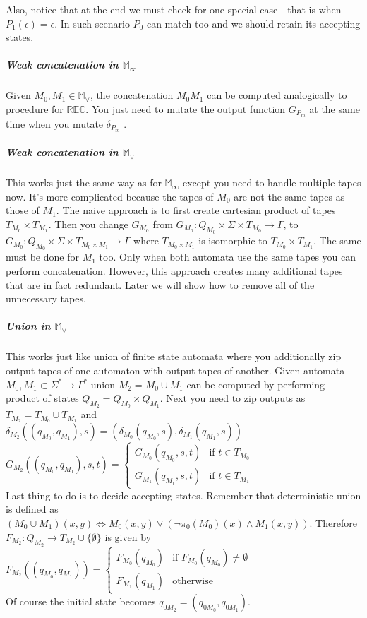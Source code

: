 \documentclass[12pt]{article}
\begin{document}
Also, notice that at the end we must check for one special case - that is when $P_1(\epsilon)=\epsilon$. In such scenario $P_0$ can match too and we should retain its accepting states.
\subparagraph{Weak concatenation in $\mathbb{M}_\infty$} Given $M_0,M_1 \in \mathbb{M}_\vee$, the concatenation $M_0M_1$ can be computed analogically to procedure for $\mathbb{ REG}$. You just need to mutate the output function $G_{P_m}$ at the same time when you mutate $\delta_{P_m}$ . 

\subparagraph{Weak concatenation in $\mathbb{M}_\vee$} This works just the same way as for $\mathbb{M}_\infty$ except you need to handle multiple tapes now. It's more complicated because the tapes of $M_0$ are not the same tapes as those of $M_1$. The naive approach is to first create cartesian product of tapes $T_{M_0} \times T_{M_1}$. Then you change $G_{M_0}$ from $G_{M_0} : Q_{M_0} \times \Sigma \times T_{M_0} \rightarrow \Gamma$, to $G_{M_0} : Q_{M_0} \times \Sigma \times T_{M_0 \times M_1} \rightarrow \Gamma$ where $T_{M_0 \times M_1}$ is isomorphic to $T_{M_0} \times T_{M_1}$. The same must be done for $M_1$ too. Only when both automata use the same tapes you can perform concatenation. However, this approach creates many additional tapes that are in fact redundant. Later we  will show how to remove all of the unnecessary tapes.

\subparagraph{Union in $\mathbb{M}_\vee$}  This works just like union of finite state automata where you additionally zip output tapes of one automaton with output tapes of another. Given automata $M_0,M_1 \subset \Sigma^* \rightarrow \Gamma^*$ union $M_2=M_0 \cup M_1$ can be computed by performing product of states $Q_{M_2} = Q_{M_0} \times Q_{M_1}$. Next you need to zip outputs as $T_{M_2} = T_{M_0} \cup T_{M_1}$  and \\
$\delta_{M_2}((q_{M_0},q_{M_1}),s) = 
(\delta_{M_0}(q_{M_0},s),\delta_{M_1}(q_{M_1},s))$ \\
$G_{M_2}((q_{M_0},q_{M_1}),s,t) = \begin{cases}
G_{M_0}(q_{M_0},s,t)  & \mbox{if }  t \in T_{M_0} \\
G_{M_1}(q_{M_1},s,t)  & \mbox{if }  t \in T_{M_1}
\end{cases}$\\
Last thing to do is to decide accepting states. Remember that deterministic union is defined as $(M_0 \cup M_1)(x,y) \iff M_0(x,y) \vee (\neg \pi_0(M_0)(x) \wedge M_1(x,y))$. Therefore $F_{M_2} : Q_{M_2}  \rightarrow T_{M_2} \cup \{\emptyset\}$ is given by \\
$F_{M_2}((q_{M_0},q_{M_1})) = \begin{cases}
F_{M_0}(q_{M_0})  & \mbox{if }  F_{M_0}(q_{M_0}) \ne \emptyset  \\
F_{M_1}(q_{M_1})  & \mbox{otherwise} 
\end{cases} $ \\
Of course the initial state becomes $q_{0M_2}=(q_{0M_0},q_{0M_1})$.
\end{document}
